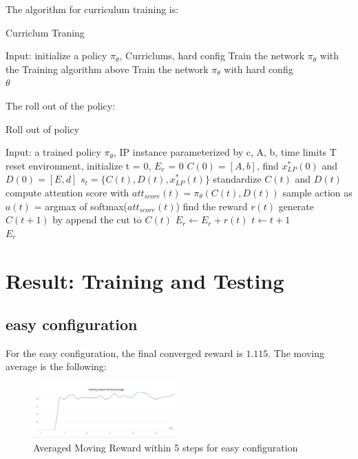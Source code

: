 \documentclass{article}
\begin{document}
The algorithm for curriculum training is:
\begin{algorithm}[H]
\caption{Curriclum Traning}\label{alg:cap}
\begin{algorithmic}[1]
\State Input: initialize a policy $\pi_\theta$, Curriclums, hard config 
\State Train the network $\pi_\theta$ with the Training algorithm above
\EndFor
\State Train the network $\pi_\theta$ with hard config \\
\Return $\theta$
\end{algorithmic}
\end{algorithm}

The roll out of the policy:
\begin{algorithm}[H]
\caption{Roll out of policy}\label{alg:cap}
\begin{algorithmic}[1]
\State Input: a trained policy $\pi_\theta$, IP instance parameterized by c, A, b, time limits T
\State reset environment, initialize t = 0, $E_r$ = 0
\State $C(0) = [A,b]$, find $x^*_{LP}(0)$ and $D(0) = [E,d]$
	\State $s_t = \{C(t), D(t), x^*_{LP}(t)\}$
	\State standardize $C(t)$ and $D(t)$
	\State compute attention score with $att_{score}(t) = \pi_\theta(C(t), D(t))$
	\State sample action as $a(t)$ = argmax of softmax($att_{score}(t)$) 
	\State find the reward $r(t)$
	\State generate $C(t+1)$ by append the cut to $C(t)$
	\State $E_r \gets E_r + r(t)$
	\State $t \gets t + 1$
\EndWhile \\
\Return $E_r$

\end{algorithmic}
\end{algorithm}


\section{Result: Training and Testing}
\subsection{easy configuration}
For the easy configuration, the final converged reward is $1.115$. The moving average is the following:
\begin{figure}[H]
\centering
\includegraphics[width=0.5\textwidth]{easy_config.png}
\caption{Averaged Moving Reward within 5 steps for easy configuration}    
\end{figure} 
\end{document}
